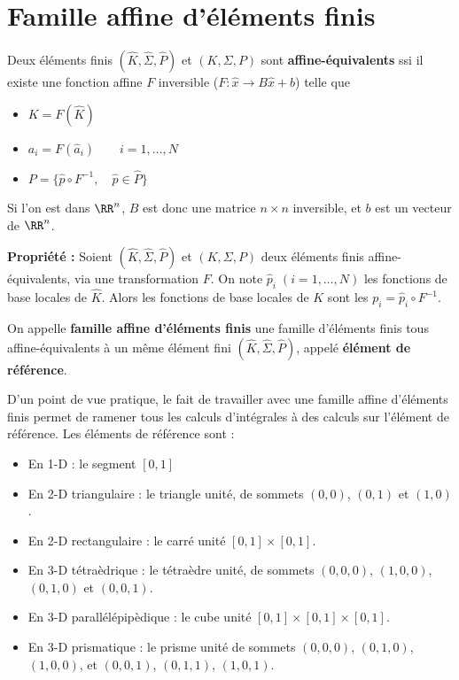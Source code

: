 \section{Famille affine d'éléments finis}
\noindent
%
%
\begin{definition}
  Deux éléments finis $(\hat{K},\hat{\Sigma},\hat{P})$ et $(K,\Sigma,P)$
  sont {\bf affine-équivalents} ssi il existe une fonction affine $F$
  inversible ($F: \hat{x} \longrightarrow B\hat{x}+b$) telle que
  \begin{itemize}
  \item $K=F(\hat{K})$
  \item $a_i=F(\hat{a}_i) \qquad i=1,\ldots,N$
  \item $P=\{ \hat{p}\circ F^{-1} , \quad \hat{p}\in \hat{P} \}$
  \end{itemize}\label{def:28}
\end{definition}
%
\begin{remark}
  Si l'on est dans $\RR^n$, $B$ est donc une matrice $n\times n$ inversible,
  et $b$ est un vecteur de $\RR^n$.\label{rem:10}
\end{remark}

%
{\bf Propriété :} Soient $(\hat{K},\hat{\Sigma},\hat{P})$ et
$(K,\Sigma,P)$ deux éléments finis affine-équivalents, via une
transformation $F$. On note $\hat{p}_i \; (i=1,\ldots,N)$ les fonctions de
base locales de $\hat{K}$. Alors les fonctions de base locales de $K$ sont les
$p_i=\hat{p}_i\circ F^{-1}$.
%
\begin{definition}
  On appelle {\bf famille affine d'éléments finis} une famille
  d'éléments finis tous affine-équivalents à un même élément
  fini $(\hat{K},\hat{\Sigma},\hat{P})$, appelé {\bf élément de
  référence}.\label{def:29}
\end{definition}

%
D'un point de vue pratique, le fait de travailler avec une famille affine
d'éléments finis permet de ramener tous les calculs d'intégrales à des
calculs sur l'élément de référence.
%
Les éléments de référence sont :
\begin{itemize}
\item En 1-D : le segment $[0,1]$
\item En 2-D triangulaire : le triangle unité, de sommets $(0,0)$, $(0,1)$ et $(1,0)$.
\item En 2-D rectangulaire : le carré unité $[0,1]\times[0,1]$.
\item En 3-D tétraèdrique : le tétraèdre unité, de sommets $(0,0,0)$, $(1,0,0)$, $(0,1,0)$ et $(0,0,1)$.
\item En 3-D parallélépipèdique : le cube unité $[0,1]\times[0,1]\times[0,1]$.
\item En 3-D prismatique : le prisme unité de sommets $(0,0,0)$, $(0,1,0)$, $(1,0,0)$, et $(0,0,1)$, $(0,1,1)$, $(1,0,1)$.
\end{itemize}

